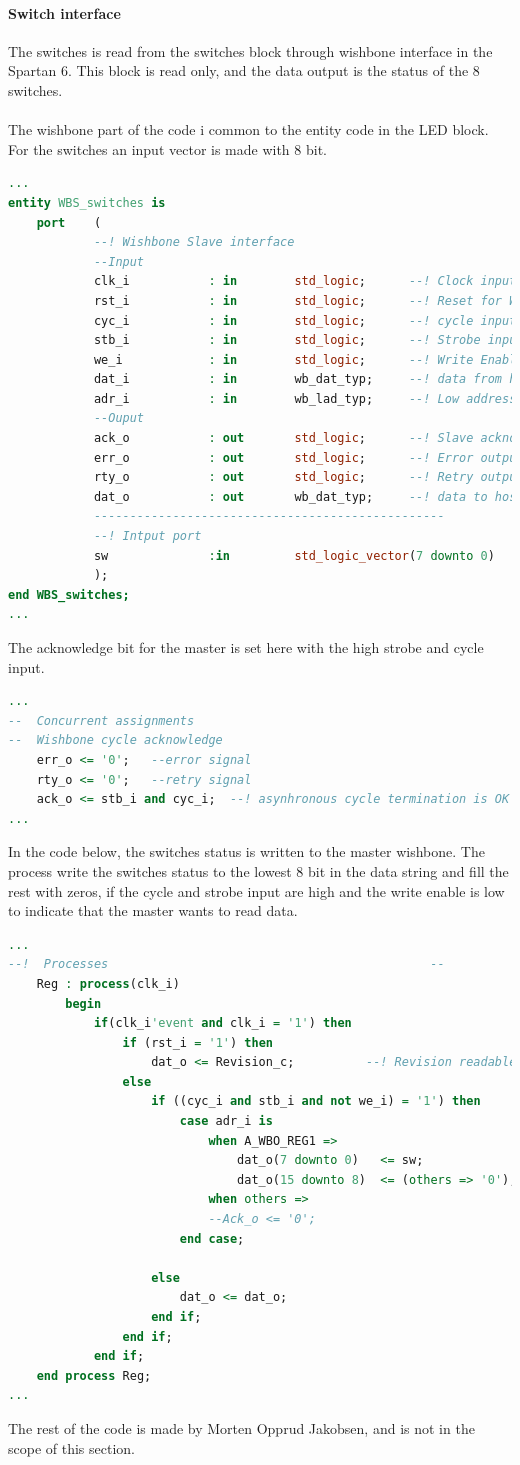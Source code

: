 \paragraph{Switch interface}
The switches is read from the switches block through wishbone interface in the Spartan 6. This block is read only, and the data output is the status of the 8 switches.\\\\
The wishbone part of the code i common to the entity code in the LED block. For the switches an input vector is made with 8 bit.
\begin{lstlisting}[language=VHDL]
...
entity WBS_switches is
	port	(
			--! Wishbone Slave interface
			--Input
			clk_i			: in		std_logic;		--! Clock input from SYSCON
			rst_i			: in		std_logic;		--! Reset for Wishbone interface
			cyc_i			: in		std_logic;		--! cycle input, asserted when cycle is in progress
			stb_i			: in		std_logic;		--! Strobe input, similar to Chip Select
			we_i			: in		std_logic;		--! Write Enable: High=WR, Low=RD
			dat_i			: in		wb_dat_typ;		--! data from host
			adr_i			: in		wb_lad_typ;		--! Low address input
			--Ouput
			ack_o			: out		std_logic;		--! Slave acknowledge output, asserted after sucessful cycle
			err_o			: out		std_logic;		--! Error output, abnormal cycle termination
			rty_o			: out		std_logic;		--! Retry output, slave not ready
			dat_o			: out		wb_dat_typ;		--! data to host
			-------------------------------------------------
			--! Intput port
			sw				:in			std_logic_vector(7 downto 0)
			);
end WBS_switches;
...
\end{lstlisting}
The acknowledge bit for the master is set here with the high strobe and cycle input.
\begin{lstlisting}[language=VHDL]
...
--  Concurrent assignments
--	Wishbone cycle acknowledge
	err_o <= '0';	--error signal
	rty_o <= '0';	--retry signal
	ack_o <= stb_i and cyc_i;  --! asynhronous cycle termination is OK here.
...
\end{lstlisting}
In the code below, the switches status is written to the master wishbone. The process write the switches status to the lowest 8 bit in the data string and fill the rest with zeros, if the cycle and strobe input are high and the write enable is low to indicate that the master wants to read data.
\begin{lstlisting}[language=VHDL]
...
--!  Processes                                             --
	Reg : process(clk_i)
		begin
			if(clk_i'event and clk_i = '1') then
				if (rst_i = '1') then
					dat_o <= Revision_c;          --! Revision readable at reset
				else
					if ((cyc_i and stb_i and not we_i) = '1') then
						case adr_i is
							when A_WBO_REG1 =>
								dat_o(7 downto 0)	<= sw;
								dat_o(15 downto 8)	<= (others => '0');
							when others =>
							--Ack_o <= '0'; 
						end case;
						
					else
						dat_o <= dat_o;
					end if;
				end if;
			end if;
	end process Reg;
...
\end{lstlisting}
The rest of the code is made by Morten Opprud Jakobsen, and is not in the scope of this section.
